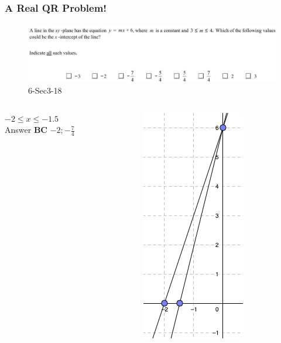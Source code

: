 \documentclass[
	11pt, %
]{beamer}
\begin{document}
\begin{frame}
	\frametitle{A Real QR Problem!}
	\framesubtitle{}
	\begin{figure}
		\includegraphics[width=\linewidth]{Graphing_Linear_Equations_Example_Question1.png}
		\caption{6-Sec3-18}
	\end{figure}

	\begin{columns}[t] 
		\begin{column}{0.45\textwidth} %
			\pause
			$-2\leq x \leq -1.5$\\
			\pause
			\bigskip
			Answer \textbf{BC} $-2;-\frac{7}{4}$ 
		\end{column}
		\begin{column}{0.5\textwidth} %
			\begin{figure}
				\includegraphics[width=0.2\linewidth]{Graphing_Linear_Equations_Example_Question1_1.png}
			\end{figure}
    \end{column}
	\end{columns}
\end{frame}

\end{document}
